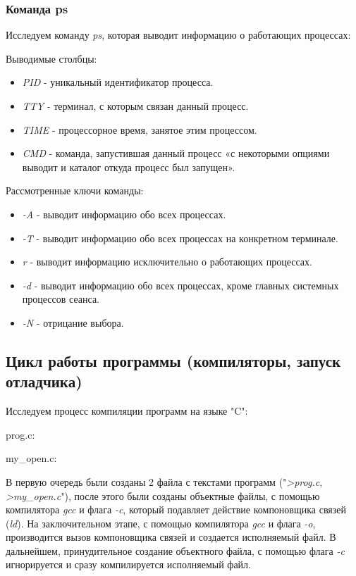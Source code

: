 \documentclass[14pt,a4paper,report]{report}
\begin{document}
\subsubsection{Команда ps}

Исследуем команду \emph{ps}, которая выводит информацию о работающих процессах:



Выводимые столбцы:

\begin{itemize}
	\item \emph{PID} - уникальный идентификатор процесса.
	\item \emph{TTY} - терминал, с которым связан данный процесс.
	\item \emph{TIME} - процессорное время, занятое этим процессом.
	\item \emph{CMD} - команда, запустившая данный процесс «с некоторыми опциями выводит и каталог откуда процесс был запущен».
\end{itemize}

\clearpage

Рассмотренные ключи команды:

\begin{itemize}
	\item \emph{-A} - выводит информацию обо всех процессах.
	\item \emph{-T} - выводит информацию обо всех процессах на конкретном терминале.
	\item \emph{r} - выводит информацию исключительно о работающих процессах.
	\item \emph{-d} - выводит информацию обо всех процессах, кроме главных системных процессов сеанса.
	\item \emph{-N} - отрицание выбора.
\end{itemize}

\subsection{Цикл работы программы (компиляторы, запуск отладчика)}

Исследуем процесс компиляции программ на языке "C":

prog.c:

my\_open.c:


В первую очередь были созданы 2 файла с текстами программ ("\emph{>prog.c}, \emph{>my\_open.c}"), после этого были созданы объектные файлы, с помощью компилятора \emph{gcc} и флага \emph{-c}, который подавляет действие компоновщика связей (\emph{ld}). На заключительном этапе, с помощью компилятора \emph{gcc} и флага \emph{-o}, производится вызов компоновщика связей и создается исполняемый файл. В дальнейшем, принудительное создание объектного файла, с помощью флага \emph{-c} игнорируется и сразу компилируется исполняемый файл.
\end{document}
